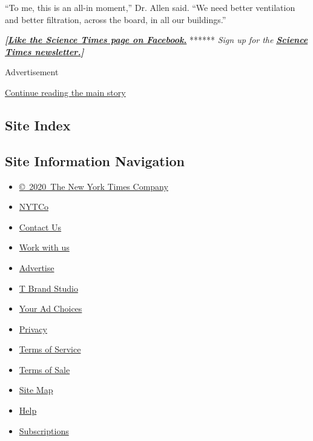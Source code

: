 ``To me, this is an all-in moment,'' Dr. Allen said. ``We need better
ventilation and better filtration, across the board, in all our
buildings.''

\textbf{\emph{{[}}\href{http://on.fb.me/1paTQ1h}{\emph{Like the Science
Times page on Facebook.}}} ****** \emph{\textbar{} Sign up for the}
\textbf{\href{http://nyti.ms/1MbHaRU}{\emph{Science Times
newsletter.}}\emph{{]}}}

Advertisement

\protect\hyperlink{after-bottom}{Continue reading the main story}

\hypertarget{site-index}{%
\subsection{Site Index}\label{site-index}}

\hypertarget{site-information-navigation}{%
\subsection{Site Information
Navigation}\label{site-information-navigation}}

\begin{itemize}
\tightlist
\item
  \href{https://help.nytimes.com/hc/en-us/articles/115014792127-Copyright-notice}{©~2020~The
  New York Times Company}
\end{itemize}

\begin{itemize}
\tightlist
\item
  \href{https://www.nytco.com/}{NYTCo}
\item
  \href{https://help.nytimes.com/hc/en-us/articles/115015385887-Contact-Us}{Contact
  Us}
\item
  \href{https://www.nytco.com/careers/}{Work with us}
\item
  \href{https://nytmediakit.com/}{Advertise}
\item
  \href{http://www.tbrandstudio.com/}{T Brand Studio}
\item
  \href{https://www.nytimes.com/privacy/cookie-policy\#how-do-i-manage-trackers}{Your
  Ad Choices}
\item
  \href{https://www.nytimes.com/privacy}{Privacy}
\item
  \href{https://help.nytimes.com/hc/en-us/articles/115014893428-Terms-of-service}{Terms
  of Service}
\item
  \href{https://help.nytimes.com/hc/en-us/articles/115014893968-Terms-of-sale}{Terms
  of Sale}
\item
  \href{https://spiderbites.nytimes.com}{Site Map}
\item
  \href{https://help.nytimes.com/hc/en-us}{Help}
\item
  \href{https://www.nytimes.com/subscription?campaignId=37WXW}{Subscriptions}
\end{itemize}
